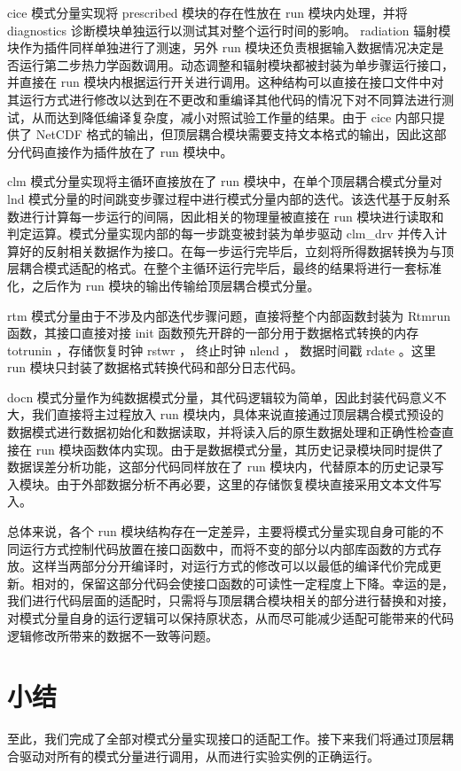 cice 模式分量实现将 prescribed 模块的存在性放在 run 模块内处理，并将 diagnostics 诊断模块单独运行以测试其对整个运行时间的影响。 radiation 辐射模块作为插件同样单独进行了测速，另外 run 模块还负责根据输入数据情况决定是否运行第二步热力学函数调用。动态调整和辐射模块都被封装为单步骤运行接口，并直接在 run 模块内根据运行开关进行调用。这种结构可以直接在接口文件中对其运行方式进行修改以达到在不更改和重编译其他代码的情况下对不同算法进行测试，从而达到降低编译复杂度，减小对照试验工作量的结果。由于 cice 内部只提供了 NetCDF 格式的输出，但顶层耦合模块需要支持文本格式的输出，因此这部分代码直接作为插件放在了 run 模块中。

clm 模式分量实现将主循环直接放在了 run 模块中，在单个顶层耦合模式分量对 lnd 模式分量的时间跳变步骤过程中进行模式分量内部的迭代。该迭代基于反射系数进行计算每一步运行的间隔，因此相关的物理量被直接在 run 模块进行读取和判定运算。模式分量实现内部的每一步跳变被封装为单步驱动 clm\_drv 并传入计算好的反射相关数据作为接口。在每一步运行完毕后，立刻将所得数据转换为与顶层耦合模式适配的格式。在整个主循环运行完毕后，最终的结果将进行一套标准化，之后作为 run 模块的输出传输给顶层耦合模式分量。

rtm 模式分量由于不涉及内部迭代步骤问题，直接将整个内部函数封装为 Rtmrun 函数，其接口直接对接 init 函数预先开辟的一部分用于数据格式转换的内存 totrunin ，存储恢复时钟 rstwr ， 终止时钟 nlend ， 数据时间戳 rdate 。这里 run 模块只封装了数据格式转换代码和部分日志代码。

docn 模式分量作为纯数据模式分量，其代码逻辑较为简单，因此封装代码意义不大，我们直接将主过程放入 run 模块内，具体来说直接通过顶层耦合模式预设的数据模式进行数据初始化和数据读取，并将读入后的原生数据处理和正确性检查直接在 run 模块函数体内实现。由于是数据模式分量，其历史记录模块同时提供了数据误差分析功能，这部分代码同样放在了 run 模块内，代替原本的历史记录写入模块。由于外部数据分析不再必要，这里的存储恢复模块直接采用文本文件写入。

总体来说，各个 run 模块结构存在一定差异，主要将模式分量实现自身可能的不同运行方式控制代码放置在接口函数中，而将不变的部分以内部库函数的方式存放。这样当两部分分开编译时，对运行方式的修改可以以最低的编译代价完成更新。相对的，保留这部分代码会使接口函数的可读性一定程度上下降。幸运的是，我们进行代码层面的适配时，只需将与顶层耦合模块相关的部分进行替换和对接，对模式分量自身的运行逻辑可以保持原状态，从而尽可能减少适配可能带来的代码逻辑修改所带来的数据不一致等问题。

\section{小结}

至此，我们完成了全部对模式分量实现接口的适配工作。接下来我们将通过顶层耦合驱动对所有的模式分量进行调用，从而进行实验实例的正确运行。